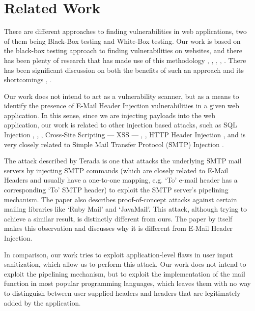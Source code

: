 \chapter{Related Work}

There are different approaches to finding vulnerabilities in web applications, two of them being Black-Box testing and White-Box testing.
Our work is based on the black-box testing approach to finding vulnerabilities on websites, and there has been plenty of research that has made use of this methodology \cite{Beizer:1995:BTT:202699}, \cite{Huang}, \cite{kals2006secubat}, \cite{payet13:ears-in-the-wild}, \cite{zanero2005automatic}. There has been significant discussion on both the benefits of such an approach \cite{black-box} and its shortcomings \cite{Doupe2012}, \cite{Doupe2010}.

Our work does not intend to act as a vulnerability scanner, but as a means to identify the presence of E-Mail Header Injection vulnerabilities in a given web application. In this sense, since we are injecting payloads into the web application, our work is related to other injection based attacks, such as SQL Injection \cite{sql1}, \cite{sql0}, \cite{sql2}, Cross-Site Scripting --- XSS --- \cite{Injection1}, \cite{KleinAmit}, HTTP Header Injection \cite{sessionride}, and is very closely related to Simple Mail Transfer Protocol (SMTP) Injection \cite{Terada2015}.

The attack described by Terada \cite{Terada2015} is one that attacks the underlying SMTP mail servers by injecting SMTP commands (which are closely related to E-Mail Headers and usually have a one-to-one mapping, e.g. `To' e-mail header has a corresponding `To' SMTP header) to exploit the SMTP server's pipelining mechanism. The paper also describes proof-of-concept attacks against certain mailing libraries like `Ruby Mail' and `JavaMail'. This attack, although trying to achieve a similar result, is distinctly different from ours. The paper by itself makes this observation and discusses why it is different from E-Mail Header Injection.

In comparison, our work tries to exploit application-level flaws in user input sanitization, which allow us to perform this attack. Our work does not intend to exploit the pipelining mechanism, but to exploit the implementation of the mail function in most popular programming languages, which leaves them with no way to distinguish between user supplied headers and headers that are legitimately added by the application.

